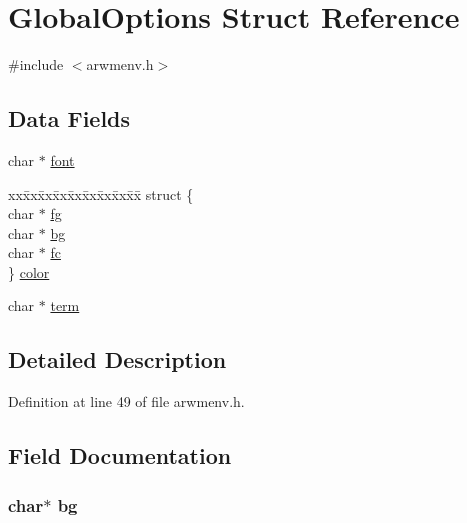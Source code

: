 \hypertarget{struct_global_options}{
\section{GlobalOptions Struct Reference}
\label{struct_global_options}
}


{\ttfamily \#include $<$arwmenv.h$>$}

\subsection*{Data Fields}
\begin{DoxyCompactItemize}
\item 
char $\ast$ \hyperlink{struct_global_options_a2ccdf0b1af9425d3da05630f4ad83e55}{font}
\item 
\begin{tabbing}
xx\=xx\=xx\=xx\=xx\=xx\=xx\=xx\=xx\=\kill
struct \{\\
\>char $\ast$ \hyperlink{struct_global_options_ad56beabb2008e5f5764b1d5f3cb95f99}{fg}\\
\>char $\ast$ \hyperlink{struct_global_options_a4606e346a7672a870cdf6f8d63072f51}{bg}\\
\>char $\ast$ \hyperlink{struct_global_options_ab2c40bfed8329f7e610b145353eb7c64}{fc}\\
\} \hyperlink{struct_global_options_ae2532ccb54b0db81d8963878a3cc6ccd}{color}\\

\end{tabbing}\item 
char $\ast$ \hyperlink{struct_global_options_a7a0d03e64272a3c3e49e50d0b00f9f64}{term}
\end{DoxyCompactItemize}


\subsection{Detailed Description}


Definition at line 49 of file arwmenv.h.



\subsection{Field Documentation}
\hypertarget{struct_global_options_a4606e346a7672a870cdf6f8d63072f51}{
\subsubsection[{bg}]{\setlength{\rightskip}{0pt plus 5cm}char$\ast$ {\bf bg}}}
\label{struct_global_options_a4606e346a7672a870cdf6f8d63072f51}


